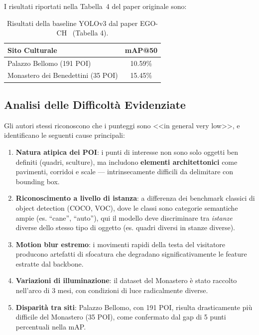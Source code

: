 \documentclass[a4paper,12pt]{report}
\begin{document}
I risultati riportati nella Tabella~4 del paper originale sono:

\begin{table}[H]
\centering
\caption{Risultati della baseline YOLOv3 dal paper EGO-CH~\cite{egoref} (Tabella 4).}
\label{tab:baseline_paper}
\begin{tabular}{lc}
\toprule
\textbf{Sito Culturale} & \textbf{mAP@50} \\
\midrule
Palazzo Bellomo (191 POI)          & 10.59\% \\
Monastero dei Benedettini (35 POI) & 15.45\% \\
\bottomrule
\end{tabular}
\end{table}

\subsection{Analisi delle Difficoltà Evidenziate}

Gli autori stessi riconoscono che i punteggi sono <<in general very low>>, e identificano le seguenti cause principali:

\begin{enumerate}
    \item \textbf{Natura atipica dei POI}: i punti di interesse non sono solo oggetti ben definiti (quadri, sculture), ma includono \textbf{elementi architettonici} come pavimenti, corridoi e scale --- intrinsecamente difficili da delimitare con bounding box.
    \item \textbf{Riconoscimento a livello di istanza}: a differenza dei benchmark classici di object detection (COCO, VOC), dove le classi sono categorie semantiche ampie (es. ``cane'', ``auto''), qui il modello deve discriminare tra \emph{istanze} diverse dello stesso tipo di oggetto (es. quadri diversi in stanze diverse).
    \item \textbf{Motion blur estremo}: i movimenti rapidi della testa del visitatore producono artefatti di sfocatura che degradano significativamente le feature estratte dal backbone.
    \item \textbf{Variazioni di illuminazione}: il dataset del Monastero è stato raccolto nell'arco di 3 mesi, con condizioni di luce radicalmente diverse.
    \item \textbf{Disparità tra siti}: Palazzo Bellomo, con 191 POI, risulta drasticamente più difficile del Monastero (35 POI), come confermato dal gap di 5 punti percentuali nella mAP.
\end{enumerate}
\end{document}
